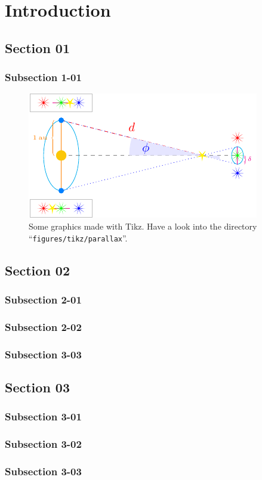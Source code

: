 \chapter{Introduction}
\thispagestyle{empty}

\bt 

\section{Section 01}

\subsection{Subsection 1-01}

\begin{figure}[H]
    \centering
    \includegraphics[scale=2.0]{figures/tikz/parallax/parallax.pdf}
    \caption{Some graphics made with Tikz. Have a look into the directory ``\texttt{figures/tikz/parallax}''.}
\end{figure}

\section{Section 02}
\bt
\subsection{Subsection 2-01}
\bt
\subsection{Subsection 2-02}
\bt
\subsection{Subsection 3-03}
\bt

\section{Section 03}
\bt
\subsection{Subsection 3-01}
\bt
\subsection{Subsection 3-02}
\bt
\subsection{Subsection 3-03}
\bt
